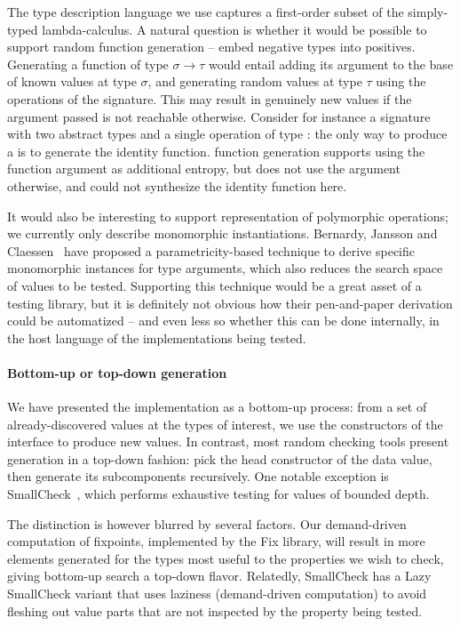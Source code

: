 The type description language we use captures a first-order subset of
the simply-typed lambda-calculus. A natural question is whether it
would be possible to support random function generation -- embed
negative types into positives. Generating a function of type $\sigma
\to \tau$ would entail adding its argument to the base of known values
at type $\sigma$, and generating random values at type $\tau$ using
the operations of the signature. This may result in genuinely new
values if the argument passed is not reachable otherwise. Consider for instance
a signature with two abstract types  and a single operation
of type : the only way to produce a  is to
generate the identity function. \qcheck function generation supports
using the function argument as additional entropy, but does not use the
argument otherwise, and could not synthesize the identity function here.

It would also be interesting to support representation of polymorphic
operations; we currently only describe monomorphic
instantiations. Bernardy, Jansson and
Claessen~\cite{DBLP:conf/esop/BernardyJC10} have proposed
a parametricity-based technique to derive specific monomorphic
instances for type arguments, which also reduces the search space of
values to be tested. Supporting this technique would be a great asset
of a testing library, but it is definitely not obvious how their
pen-and-paper derivation could be automatized -- and even less so
whether this can be done internally, in the host language of the
implementations being tested.

\paragraph{Bottom-up or top-down generation}

We have presented the  implementation as a bottom-up
process: from a set of already-discovered values at the types of
interest, we use the constructors of the interface to produce new
values. In contrast, most random checking tools present generation in
a top-down fashion: pick the head constructor of the data value, then
generate its subcomponents recursively. One notable exception is
SmallCheck~\cite{DBLP:conf/haskell/RuncimanNL08}, which performs
exhaustive testing for values of bounded depth.

The distinction is however blurred by several factors. Our
demand-driven computation of fixpoints, implemented by the Fix
library, will result in more elements generated for the types most
useful to the properties we wish to check, giving bottom-up search
a top-down flavor. Relatedly, SmallCheck has a Lazy SmallCheck variant
that uses laziness (demand-driven computation) to avoid fleshing out
value parts that are not inspected by the property being tested.

